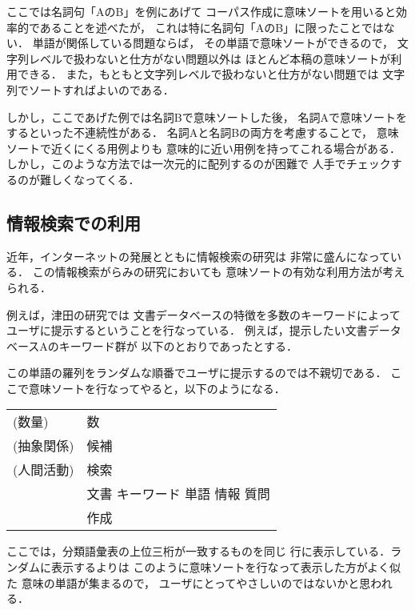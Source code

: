 ここでは名詞句「AのB」を例にあげて
コーパス作成に意味ソートを用いると効率的であることを述べたが，
これは特に名詞句「AのB」に限ったことではない．
単語が関係している問題ならば，
その単語で意味ソートができるので，
文字列レベルで扱わないと仕方がない問題以外は
ほとんど本稿の意味ソートが利用できる．
また，もともと文字列レベルで扱わないと仕方がない問題では
文字列でソートすればよいのである．

しかし，ここであげた例では名詞Bで意味ソートした後，
名詞Aで意味ソートをするといった不連続性がある．
名詞Aと名詞Bの両方を考慮することで，
意味ソートで近くにくる用例よりも
意味的に近い用例を持ってこれる場合がある．
しかし，このような方法では一次元的に配列するのが困難で
人手でチェックするのが難しくなってくる．

\subsection{情報検索での利用}

近年，インターネットの発展とともに情報検索の研究は
非常に盛んになっている．
この情報検索がらみの研究においても
意味ソートの有効な利用方法が考えられる．

例えば，津田の研究\cite{tsuda94A}では
文書データベースの特徴を多数のキーワードによって
ユーザに提示するということを行なっている．
例えば，提示したい文書データベースAのキーワード群が
以下のとおりであったとする．

\begin{quote}
\end{quote}

この単語の羅列をランダムな順番でユーザに提示するのでは不親切である．
ここで意味ソートを行なってやると，以下のようになる．

{\small\renewcommand{\arraystretch}{}
\begin{tabular}[h]{ll}
(数量)      & 数 \\
(抽象関係)  & 候補 \\
(人間活動)  & 検索 \\
            & 文書 キーワード 単語 情報 質問 \\
            & 作成 \\
\end{tabular}
}

ここでは，分類語彙表の上位三桁が一致するものを同じ
行に表示している．ランダムに表示するよりは
このように意味ソートを行なって表示した方がよく似た
意味の単語が集まるので，
ユーザにとってやさしいのではないかと思われる．

